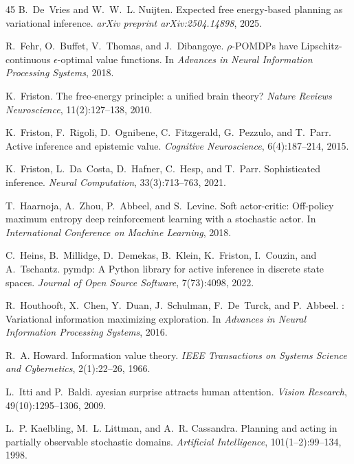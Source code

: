 \documentclass[runningheads]{llncs}
\begin{document}
\begin{thebibliography}{45}
B.~De~Vries and W.~W.~L. Nuijten.
\newblock Expected free energy-based planning as variational inference.
\newblock \emph{arXiv preprint arXiv:2504.14898}, 2025.

R.~Fehr, O.~Buffet, V.~Thomas, and J.~Dibangoye.
\newblock $\rho$-{POMDP}s have {L}ipschitz-continuous $\epsilon$-optimal value functions.
\newblock In \emph{Advances in Neural Information Processing Systems}, 2018.

K.~Friston.
\newblock The free-energy principle: a unified brain theory?
\newblock \emph{Nature Reviews Neuroscience}, 11(2):127--138, 2010.

K.~Friston, F.~Rigoli, D.~Ognibene, C.~Fitzgerald, G.~Pezzulo, and T.~Parr.
\newblock Active inference and epistemic value.
\newblock \emph{Cognitive Neuroscience}, 6(4):187--214, 2015.

K.~Friston, L.~Da~Costa, D.~Hafner, C.~Hesp, and T.~Parr.
\newblock Sophisticated inference.
\newblock \emph{Neural Computation}, 33(3):713--763, 2021.

T.~Haarnoja, A.~Zhou, P.~Abbeel, and S.~Levine.
\newblock Soft actor-critic: Off-policy maximum entropy deep reinforcement learning with a stochastic actor.
\newblock In \emph{International Conference on Machine Learning}, 2018.

C.~Heins, B.~Millidge, D.~Demekas, B.~Klein, K.~Friston, I.~Couzin, and A.~Tschantz.
\newblock pymdp: A {P}ython library for active inference in discrete state spaces.
\newblock \emph{Journal of Open Source Software}, 7(73):4098, 2022.

R.~Houthooft, X.~Chen, Y.~Duan, J.~Schulman, F.~De~Turck, and P.~Abbeel.
: Variational information maximizing exploration.
\newblock In \emph{Advances in Neural Information Processing Systems}, 2016.

R.~A. Howard.
\newblock Information value theory.
\newblock \emph{IEEE Transactions on Systems Science and Cybernetics}, 2(1):22--26, 1966.

L.~Itti and P.~Baldi.
ayesian surprise attracts human attention.
\newblock \emph{Vision Research}, 49(10):1295--1306, 2009.

L.~P. Kaelbling, M.~L. Littman, and A.~R. Cassandra.
\newblock Planning and acting in partially observable stochastic domains.
\newblock \emph{Artificial Intelligence}, 101(1--2):99--134, 1998.


\end{thebibliography}
\end{document}
